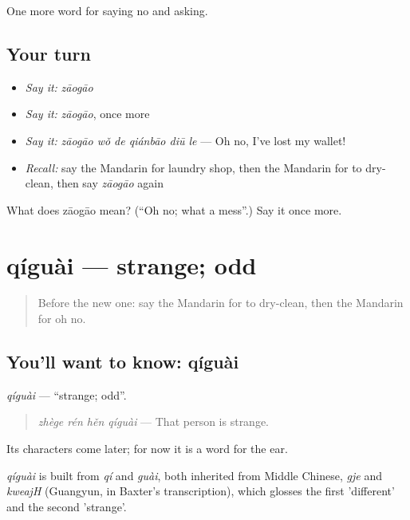 \begin{grammarlens}[title={What you've built}]
One more word for saying no and asking.
\end{grammarlens}

\subsection*{Your turn}
\begin{itemize}
\raggedright
  \item \emph{Say it:} \emph{zāogāo}
  \item \emph{Say it:} \emph{zāogāo}, once more
  \item \emph{Say it:} \emph{zāogāo wǒ de qiánbāo diū le} — Oh no, I've lost my wallet!
  \item \emph{Recall:} say the Mandarin for laundry shop, then the Mandarin for to dry-clean, then say \emph{zāogāo} again
\end{itemize}

\begin{tcolorbox}[breakable,colback=teal!4,colframe=teal!35!black,title={Before you move on}]
What does zāogāo mean? (\textquotedblleft{}Oh no; what a mess\textquotedblright{}.) Say it once more.
\end{tcolorbox}
\section[qíguài]{qíguài — strange; odd}

\label{lesson:ZH-C216-qiguai}



\begin{quote}
Before the new one: say the Mandarin for to dry-clean, then the Mandarin for oh no.
\end{quote}

\subsection*{You'll want to know: qíguài}
\emph{qíguài} — \textquotedblleft{}strange; odd\textquotedblright{}.

\begin{quote}
\emph{zhège rén hěn qíguài} — That person is strange.
\end{quote}

Its characters come later; for now it is a word for the ear.

\begin{cousinweb}
\emph{qíguài} is built from \emph{qí} and \emph{guài}, both inherited from Middle Chinese, \emph{gje} and \emph{kweajH} (Guangyun, in Baxter's transcription), which glosses the first 'different' and the second 'strange'.
\end{cousinweb}

